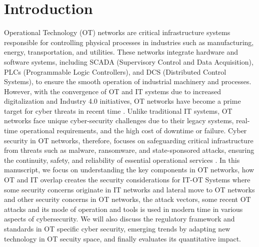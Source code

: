 \section{Introduction}
\label{sec:introduction}
Operational Technology (OT) networks are critical infrastructure systems responsible for controlling physical processes in industries such as manufacturing, energy, transportation, and utilities. These networks integrate hardware and software systems, including SCADA (Supervisory Control and Data Acquisition), PLCs (Programmable Logic Controllers), and DCS (Distributed Control Systems), to ensure the smooth operation of industrial machinery and processes. However, with the convergence of OT and IT systems due to increased digitalization and Industry 4.0 initiatives, OT networks have become a prime target for cyber threats in recent time \cite{negi2024towards} \cite{knapp2024industrial} \cite{zaid2024emerging}. Unlike traditional IT systems, OT networks face unique cyber-security challenges due to their legacy systems, real-time operational requirements, and the high cost of downtime or failure. Cyber security in OT networks, therefore, focuses on safeguarding critical infrastructure from threats such as malware, ransomware, and state-sponsored attacks, ensuring the continuity, safety, and reliability of essential operational services \cite{kalinaki2025ransomware} \cite{daniel2024emerging}. In this manuscript, we focus on understanding the key components in OT networks, how OT and IT overlap creates the security considerations for IT-OT Systems where some security concerns originate in IT networks and lateral move to OT networks and other security concerns in OT networks, the attack vectors, some recent OT attacks and its mode of operation and tools is used in modern time in various aspects of cybersecurity. We will also discuss the regulatory framework and standards in OT specific cyber security, emerging trends by adapting new technology in OT secuity space, and finally evaluates its quantitative impact. 